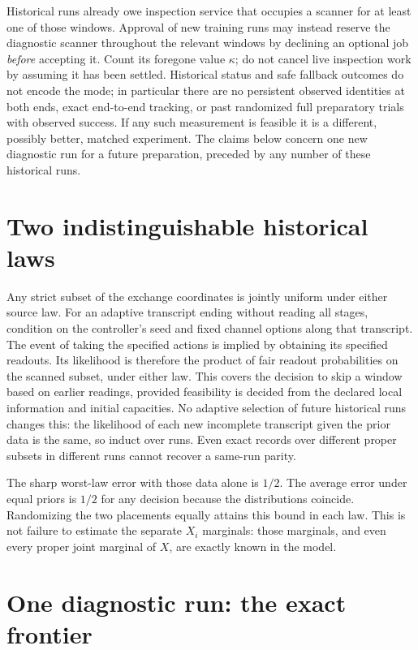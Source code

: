 \documentclass[11pt]{article}
\begin{document}
Historical runs already owe inspection service that occupies a
scanner for at least one of those windows. Approval of new training
runs may instead reserve the diagnostic scanner throughout the
relevant windows by declining an optional job \emph{before} accepting
it. Count its foregone value \(\kappa\); do not cancel live inspection
work by assuming it has been settled. Historical status and safe
fallback outcomes do not encode the mode; in particular there are
no persistent observed identities at both ends, exact end-to-end
tracking, or past randomized full preparatory trials with observed
success. If any such measurement is feasible it is a different,
possibly better, matched experiment. The claims below concern one
new diagnostic run for a future preparation, preceded by any number
of these historical runs.

\section{Two indistinguishable historical laws}
Any strict subset of the exchange coordinates is jointly uniform
under either source law. For an adaptive transcript ending without
reading all stages, condition on the controller's seed and fixed
channel options along that transcript. The event of taking the
specified actions is implied by obtaining its specified readouts.
Its likelihood is therefore the product of fair readout probabilities
on the scanned subset, under either law. This covers the decision
to skip a window based on earlier readings, provided feasibility is
decided from the declared local information and initial capacities.
No adaptive selection of future historical runs changes this: the
likelihood of each new incomplete transcript given the prior data
is the same, so induct over runs. Even exact records over different
proper subsets in different runs cannot recover a same-run parity.

The sharp worst-law error with those data alone is \(1/2\).
The average error under equal priors is \(1/2\) for any decision
because the distributions coincide. Randomizing the two placements
equally attains this bound in each law. This is not failure to
estimate the separate \(X_i\) marginals: those marginals, and even
every proper joint marginal of \(X\), are exactly known in the model.

\section{One diagnostic run: the exact frontier}
\end{document}
